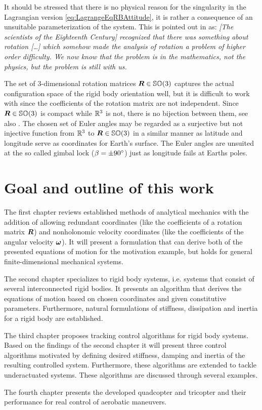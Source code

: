 It should be stressed that there is no physical reason for the singularity in the Lagrangian version \eqref{eq:LagrangeEqRBAttitude}, it is rather a consequence of an unsuitable parameterization of the system.
This is pointed out in \cite[sec.\ 1.1.1]{Schwertassek:MultibodySystems} as:
\textit{
[The scientists of the Eighteenth Century] recognized that there was something about rotation [\ldots] which somehow made the analysis of rotation a problem of higher order difficulty. 
We now know that the problem is in the mathematics, not the physics, but the problem is still with us.
}

The set of 3-dimensional rotation matrices $\boldsymbol{R}\in\mathbb{SO}(3)$ captures the actual configuration space of the rigid body orientation well, but it is difficult to work with since the coefficients of the rotation matrix are not independent.
Since $\boldsymbol{R}\in\mathbb{SO}(3)$ is compact while $\mathbb{R}^3$ is not, there is no bijection between them, see also \cite[sec.\ 1.1d]{Frankel:GeometryOfPhysics}.
The chosen set of Euler angles may be regarded as a surjective but not injective function from $\mathbb{R}^3$ to $\boldsymbol{R}\in\mathbb{SO}(3)$ in a similar manner as latitude and longitude serve as coordinates for Earth's surface. 
The Euler angles are unsuited at the so called gimbal lock ($\beta=\pm 90^\circ$) just as longitude fails at Earths poles.


\section{Goal and outline of this work}
The first chapter reviews established methods of analytical mechanics with the addition of allowing redundant coordinates (like the coefficients of a rotation matrix $\boldsymbol{R}$) and nonholonomic velocity coordinates (like the coefficients of the angular velocity $\boldsymbol{\omega}$).
It will present a formulation that can derive both of the presented equations of motion for the motivation example, but holds for general finite-dimensional mechanical systems.

The second chapter specializes to rigid body systems, i.e. systems that consist of several interconnected rigid bodies.
It presents an algorithm that derives the equations of motion based on chosen coordinates and given constitutive parameters.
Furthermore, natural formulations of stiffness, dissipation and inertia for a rigid body are established.

The third chapter proposes tracking control algorithms for rigid body systems.
Based on the findings of the second chapter it will present three control algorithms motivated by defining desired stiffness, damping and inertia of the resulting controlled system.
Furthermore, these algorithms are extended to tackle underactuated systems.
These algorithms are discussed through several examples.

The fourth chapter presents the developed quadcopter and tricopter and their performance for real control of aerobatic maneuvers.
